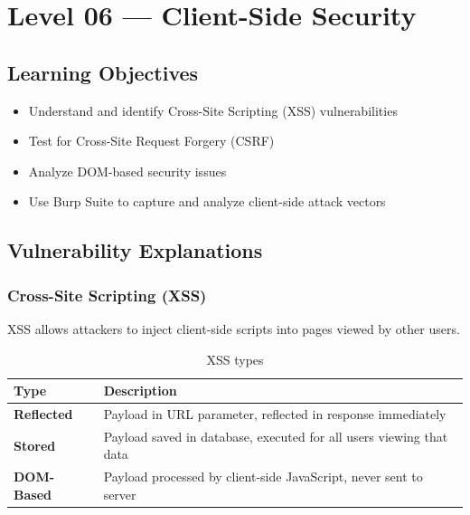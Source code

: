 \chapter{Level 06 — Client-Side Security}
\label{ch:level06}


\section{Learning Objectives}
\begin{itemize}
  \item Understand and identify Cross-Site Scripting (XSS) vulnerabilities
  \item Test for Cross-Site Request Forgery (CSRF)
  \item Analyze DOM-based security issues
  \item Use Burp Suite to capture and analyze client-side attack vectors
\end{itemize}

\section{Vulnerability Explanations}

\subsection{Cross-Site Scripting (XSS)}
XSS allows attackers to inject client-side scripts into pages viewed by other users.

\begin{table}[H]
\centering
\caption{XSS types}
\begin{tabularx}{\textwidth}{>{\bfseries}lX}
\toprule
Type & Description \\
\midrule
Reflected & Payload in URL parameter, reflected in response immediately \\
Stored & Payload saved in database, executed for all users viewing that data \\
DOM-Based & Payload processed by client-side JavaScript, never sent to server \\
\bottomrule
\end{tabularx}
\end{table}

